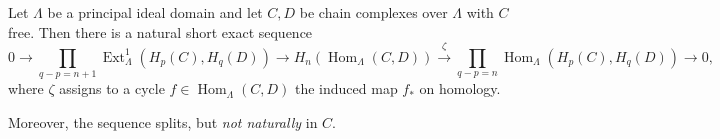 Let $\Lambda$ be a principal ideal domain and let $C, D$ be chain complexes over $\Lambda$ with $C$ free. Then there is a natural short exact sequence
$$0 \rightarrow \prod_{q-p=n+1} \operatorname{Ext}_{\Lambda}^1(H_p(C), H_q(D)) \rightarrow H_n(\operatorname{Hom}_{\Lambda}(C, D)) \xrightarrow{\zeta} \prod_{q-p=n} \operatorname{Hom}_{\Lambda}(H_p(C), H_q(D)) \rightarrow 0,$$
where $\zeta$ assigns to a cycle $f \in \operatorname{Hom}_{\Lambda}(C, D)$ the induced map $f_*$ on homology.

Moreover, the sequence splits, but \emph{not naturally} in $C$.
